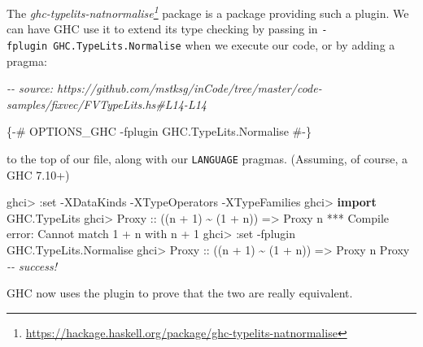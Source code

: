 \documentclass[]{article}
\newenvironment{Shaded}{}{}
\newcommand{\CommentTok}[1]{\textcolor[rgb]{0.38,0.63,0.69}{\textit{#1}}}
\newcommand{\DataTypeTok}[1]{\textcolor[rgb]{0.56,0.13,0.00}{#1}}
\newcommand{\DecValTok}[1]{\textcolor[rgb]{0.25,0.63,0.44}{#1}}
\newcommand{\FunctionTok}[1]{\textcolor[rgb]{0.02,0.16,0.49}{#1}}
\newcommand{\KeywordTok}[1]{\textcolor[rgb]{0.00,0.44,0.13}{\textbf{#1}}}
\newcommand{\NormalTok}[1]{#1}
\newcommand{\OperatorTok}[1]{\textcolor[rgb]{0.40,0.40,0.40}{#1}}
\newcommand{\OtherTok}[1]{\textcolor[rgb]{0.00,0.44,0.13}{#1}}
\renewcommand{\href}[2]{#2\footnote{\url{#1}}}
\begin{document}
The
\emph{\href{https://hackage.haskell.org/package/ghc-typelits-natnormalise}{ghc-typelits-natnormalise}}
package is a package providing such a plugin. We can have GHC use it to extend
its type checking by passing in \texttt{-fplugin\ GHC.TypeLits.Normalise} when
we execute our code, or by adding a pragma:

\begin{Shaded}
\begin{Highlighting}[]
\CommentTok{{-}{-} source: https://github.com/mstksg/inCode/tree/master/code{-}samples/fixvec/FVTypeLits.hs\#L14{-}L14}

\OtherTok{\{{-}\# OPTIONS\_GHC {-}fplugin GHC.TypeLits.Normalise \#{-}\}}
\end{Highlighting}
\end{Shaded}

to the top of our file, along with our \texttt{LANGUAGE} pragmas. (Assuming, of
course, a GHC 7.10+)

\begin{Shaded}
\begin{Highlighting}[]
\NormalTok{ghci}\OperatorTok{\textgreater{}} \OperatorTok{:}\NormalTok{set }\OperatorTok{{-}}\DataTypeTok{XDataKinds} \OperatorTok{{-}}\DataTypeTok{XTypeOperators} \OperatorTok{{-}}\DataTypeTok{XTypeFamilies}
\NormalTok{ghci}\OperatorTok{\textgreater{}} \KeywordTok{import} \DataTypeTok{GHC.TypeLits}
\NormalTok{ghci}\OperatorTok{\textgreater{}} \DataTypeTok{Proxy}\OtherTok{ ::}\NormalTok{ ((n }\OperatorTok{+} \DecValTok{1}\NormalTok{) }\OperatorTok{\textasciitilde{}}\NormalTok{ (}\DecValTok{1} \OperatorTok{+}\NormalTok{ n)) }\OtherTok{=\textgreater{}} \DataTypeTok{Proxy}\NormalTok{ n}
\OperatorTok{***} \DataTypeTok{Compile} \FunctionTok{error}\OperatorTok{:} \DataTypeTok{Cannot}\NormalTok{ match }\OtherTok{\textasciigrave{}1 + n\textasciigrave{}}\NormalTok{ with }\OtherTok{\textasciigrave{}n + 1\textasciigrave{}}
\NormalTok{ghci}\OperatorTok{\textgreater{}} \OperatorTok{:}\NormalTok{set }\OperatorTok{{-}}\NormalTok{fplugin }\DataTypeTok{GHC.TypeLits.Normalise}
\NormalTok{ghci}\OperatorTok{\textgreater{}} \DataTypeTok{Proxy}\OtherTok{ ::}\NormalTok{ ((n }\OperatorTok{+} \DecValTok{1}\NormalTok{) }\OperatorTok{\textasciitilde{}}\NormalTok{ (}\DecValTok{1} \OperatorTok{+}\NormalTok{ n)) }\OtherTok{=\textgreater{}} \DataTypeTok{Proxy}\NormalTok{ n}
\DataTypeTok{Proxy}   \CommentTok{{-}{-} success!}
\end{Highlighting}
\end{Shaded}

GHC now uses the plugin to prove that the two are really equivalent.
\end{document}
